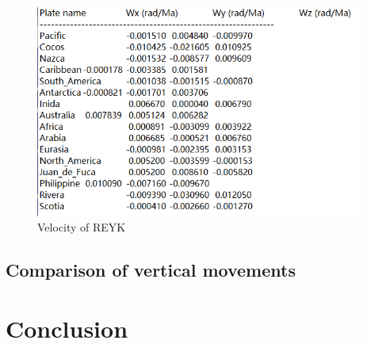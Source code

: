 \documentclass{article}
\begin{document}
\begin{figure}[htbp]
  \centering
  \includegraphics[height=7cm]{../source/nuvel.png}
  \caption{Velocity of REYK}
  \label{fig:Vel_REYK}
\end{figure}


\subsection{Comparison of vertical movements}



\section{Conclusion}
\end{document}
